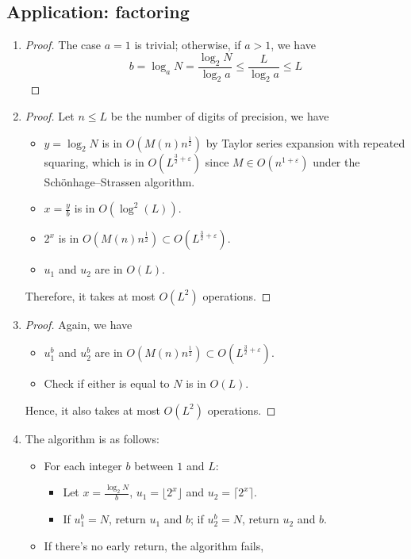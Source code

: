 \documentclass[../main.tex]{subfiles}
\begin{document}
\subsection{Application: factoring}
\begin{exercise}
\end{exercise}
\begin{enumerate}
    \item \begin{proof}
    The case $a=1$ is trivial; otherwise, if $a>1$, we have
    \[
        b=\log_a N=\frac{\log_2 N}{\log_2 a}\leq\frac{L}{\log_2 a}\leq L
    \]
    \end{proof}
    \item \begin{proof}
    Let $n\leq L$ be the number of digits of precision, we have
    \begin{itemize}
        \item $y=\log_2 N$ is in $O(M(n)n^\frac{1}{2})$ by Taylor series expansion with repeated squaring, which is in $O(L^{\frac{3}{2}+\varepsilon})$ since $M\in O(n^{1+\varepsilon})$ under the Schönhage–Strassen algorithm.
        \item $x=\frac{y}{b}$ is in $O(\log^2(L))$.
        \item $2^x$ is in $O(M(n)n^\frac{1}{2})\subset O(L^{\frac{3}{2}+\varepsilon})$.
        \item $u_1$ and $u_2$ are in $O(L)$.
    \end{itemize} 
    
    Therefore, it takes at most $O(L^2)$ operations.
    \end{proof}
    
    \item \begin{proof}
    Again, we have
    \begin{itemize}
        \item $u_1^b$ and $u_2^b$ are in $O(M(n)n^\frac{1}{2})\subset O(L^{\frac{3}{2}+\varepsilon})$.
        \item Check if either is equal to $N$ is in $O(L)$.
    \end{itemize} 
    
    Hence, it also takes at most $O(L^2)$ operations.
    \end{proof}
    
    \item The algorithm is as follows:
    \begin{itemize}
        \item For each integer $b$ between $1$ and $L$:
        \begin{itemize}
            \item Let $x=\frac{\log_2 N}{b}$, $u_1=\lfloor 2^x\rfloor$ and $u_2=\lceil 2^x\rceil$.
            \item If $u_1^b=N$, return $u_1$ and $b$; if $u_2^b=N$, return $u_2$ and $b$.
        \end{itemize}
        \item If there's no early return, the algorithm fails,
    \end{itemize}
    

\end{enumerate}
\end{document}
